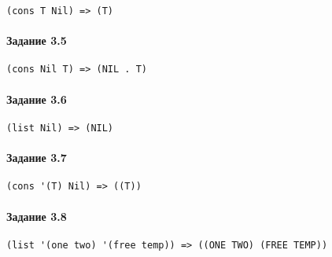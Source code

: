 \begin{lstlisting}
(cons T Nil) => (T)
\end{lstlisting}


\paragraph{Задание 3.5} \hfill

\begin{lstlisting}
(cons Nil T) => (NIL . T)
\end{lstlisting}


\paragraph{Задание 3.6} \hfill

\begin{lstlisting}
(list Nil) => (NIL)
\end{lstlisting}


\paragraph{Задание 3.7} \hfill

\begin{lstlisting}
(cons '(T) Nil) => ((T))
\end{lstlisting}


\paragraph{Задание 3.8} \hfill

\begin{lstlisting}
(list '(one two) '(free temp)) => ((ONE TWO) (FREE TEMP))
\end{lstlisting}
